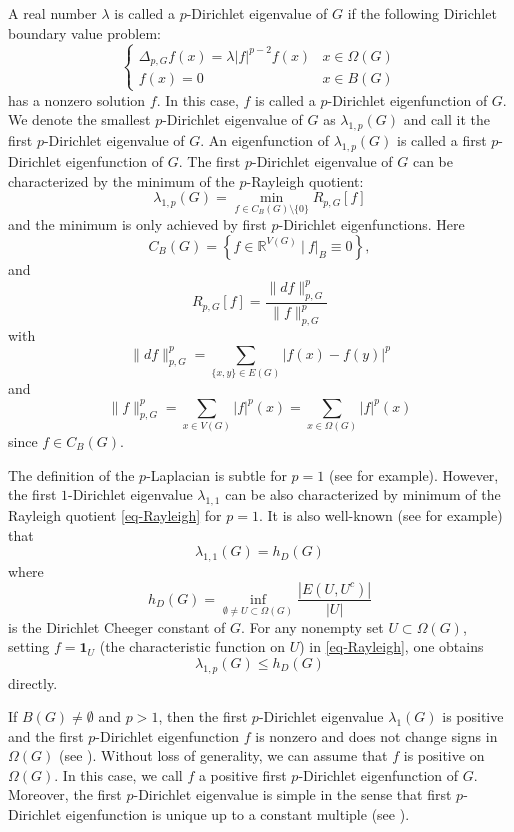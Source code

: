 \documentclass[12pt]{amsart}
\def\R{\mathbb{R}}
\def\1{\mathbf{1}}
\theoremstyle{definition}
\theoremstyle{remark}
\numberwithin{equation}{section}
\begin{document}
A real number $\lambda$ is called  a $p$-Dirichlet eigenvalue of $G$ if the following Dirichlet boundary value problem:
$$\left\{\begin{array}{ll}\Delta_{p,G} f(x)=\lambda |f|^{p-2}f(x)&x\in \Omega(G)\\
f(x)=0&x\in B(G)
\end{array}\right.$$
has a nonzero solution $f$. In this case, $f$ is called a $p$-Dirichlet eigenfunction of $G$. We denote the smallest $p$-Dirichlet eigenvalue of $G$ as $\lambda_{1,p}(G)$ and call it the first $p$-Dirichlet eigenvalue of $G$. An eigenfunction of $\lambda_{1,p}(G)$ is called a  first $p$-Dirichlet eigenfunction of $G$. The  first $p$-Dirichlet eigenvalue of $G$ can be characterized by the minimum of the $p$-Rayleigh quotient:
\begin{equation}\label{eq-Rayleigh}
\lambda_{1,p}(G)=\min_{f\in C_B(G)\setminus\{0\}}R_{p,G}[f]
\end{equation}
and the minimum is only achieved by first $p$-Dirichlet eigenfunctions. Here
$$C_B(G)=\left\{f\in \R^{V(G)}\ \Big|\ f|_B\equiv 0\right\},$$
and
$$R_{p,G}[f]=\frac{\|df\|_{p,G}^p}{\|f\|_{p,G}^p}$$
with
$$\|df\|_{p,G}^p=\sum_{\{x,y\}\in E(G)}|f(x)-f(y)|^p$$
and
$$\|f\|_{p,G}^p=\sum_{x\in V(G)}|f|^p(x)=\sum_{x\in\Omega(G)}|f|^p(x)$$
since $f\in C_B(G).$ 

The definition of the $p$-Laplacian is subtle for $p=1$ (see \cite{Ch} for example).  However, the first $1$-Dirichlet eigenvalue $\lambda_{1,1}$ can be also characterized by minimum of the Rayleigh quotient \eqref{eq-Rayleigh} for $p=1$. It is also well-known (see \cite{Gr,HW} for example) that 
$$\lambda_{1,1}(G)=h_D(G)$$
where 
\begin{equation}\label{eq-Cheeger-constant}
h_D(G)=\inf_{\emptyset\neq U\subset \Omega(G)}\frac{|E(U,U^c)|}{|U|}
\end{equation}
is the Dirichlet Cheeger constant of $G$. For any nonempty set $U\subset \Omega(G)$, setting $f=\1_U$ (the characteristic function on $U$) in \eqref{eq-Rayleigh}, one obtains 
\begin{equation*}
\lambda_{1,p}(G)\leq h_D(G)
\end{equation*}
directly.

If $B(G)\neq \emptyset$ and $p>1$, then
the first $p$-Dirichlet eigenvalue $\lambda_1(G)$ is positive and the first $p$-Dirichlet eigenfunction $f$ is nonzero and does not change signs in $\Omega(G)$ (see \cite{HW}).  Without loss of generality, we can assume that $f$ is positive on $\Omega(G)$. In this case, we call $f$ a positive first $p$-Dirichlet eigenfunction of $G$. Moreover, the first $p$-Dirichlet eigenvalue is simple in the sense that first $p$-Dirichlet eigenfunction is unique up to a constant multiple (see \cite{HW}).
\end{document}

